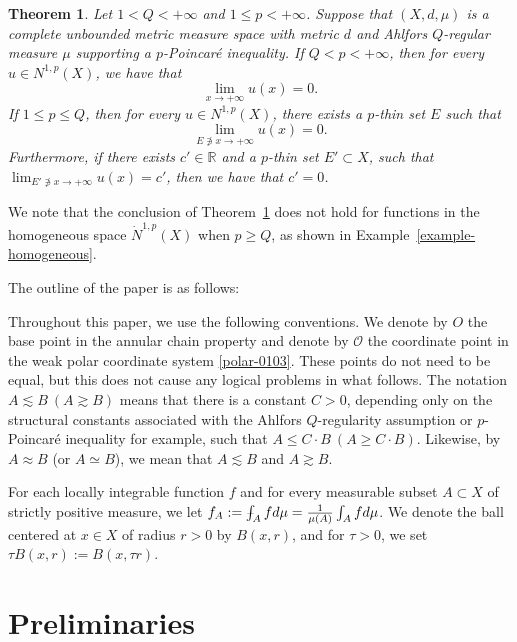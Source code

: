\documentclass[10pt]{amsart}
\def\Xint#1{\mathchoice
	{\XXint\displaystyle\textstyle{#1}}
	{\XXint\textstyle\scriptstyle{#1}}
	{\XXint\scriptstyle\scriptscriptstyle{#1}}
	{\XXint\scriptscriptstyle\scriptscriptstyle{#1}}
	\!\int}
\def\XXint#1#2#3{{\setbox0=\hbox{$#1{#2#3}{\int}$ }
		\vcenter{\hbox{$#2#3$ }}\kern-.6\wd0}}
\def\dashint{\Xint-}
\newtheorem{theorem}{Theorem}[section]
\numberwithin{equation}{section}
\newcommand{\R}{\mathbb{R}}
\begin{document}
\begin{theorem}\label{thm1.1-3105}
Let $1<Q<+\infty$ and $1\le p<+\infty$.   Suppose that $(X,d,\mu)$ is a complete unbounded metric measure space with metric $d$ and Ahlfors $Q$-regular measure $\mu$ supporting a $p$-Poincar\'e inequality.  If $Q<p<+\infty$, then for every $u\in N^{1,p}(X)$, we have that
\begin{equation}\label{eq:p>Q Inhom}
\lim_{x\to+\infty} u(x)=0.
\end{equation}
If $1\le p\le Q$, then for every $u\in N^{1,p}(X)$, there exists a $p$-thin set $E$ such that 
	\begin{equation}\label{eq1.4-0506}
		\lim_{E\not\ni x \to+\infty}u(x)=0.
	\end{equation}
 Furthermore, if there exists $c'\in\R$ and a $p$-thin set $E'\subset X$, such that $\lim_{E'\not\ni x\to+\infty}u(x)=c'$, then we have that $c'=0$. 
\end{theorem}

We note that the conclusion of Theorem~\ref{thm1.1-3105} does not hold for functions in the homogeneous space $\dot N^{1,p}(X)$ when $p\ge Q$, as shown in Example~\ref{example-homogeneous}.  

The outline of the paper is as follows: 
 \tableofcontents
 



Throughout this paper, we use the following conventions. We denote by $O$ the base point in the annular chain property and denote by $\mathcal O$ the coordinate 
point in the weak polar coordinate system \eqref{polar-0103}. These points do not need to be equal, but this does not cause any logical problems in what follows. 
The notation $A\lesssim B\ (A\gtrsim B)$ means that there is a constant $C>0$, depending only on the structural constants associated with the Ahlfors $Q$-regularity assumption or $p$-Poincar\'e inequality for example,  such that $A\leq C \cdot B\ (A\geq C\cdot B)$.  Likewise, by $A\approx B$ (or $A\simeq B$), we mean that $A\lesssim B$ and $A\gtrsim B$. 

For  each locally integrable function $f$ and for every measurable subset $A\subset X$ of strictly positive measure, we let $f_A:=\dashint_Afd\mu=\frac{1}{\mu(A)}\int_Afd\mu$.  We denote the ball centered at $x\in X$ of radius $r>0$ by $B(x,r)$, and for $\tau>0$, we set $\tau B(x,r):=B(x,\tau r)$.

\section{Preliminaries}
\end{document}
